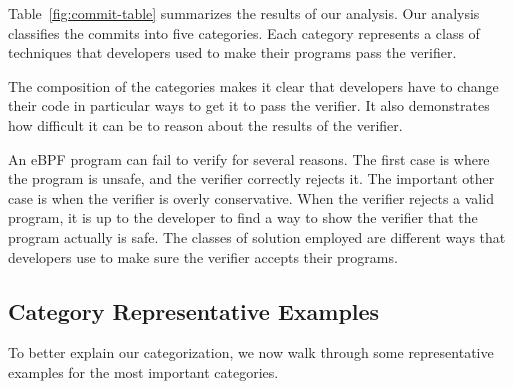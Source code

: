 Table~\ref{fig:commit-table} summarizes the results of our analysis.
Our analysis classifies the commits into five categories.
Each category represents a class of techniques that developers used to make their programs pass the verifier.


The composition of the categories makes it clear that developers have to change their code in particular ways to get it to pass the verifier.
It also demonstrates how difficult it can be to reason about the results of the verifier.

An eBPF program can fail to verify for several reasons.
The first case is where the program is unsafe, and the verifier correctly rejects it.
The important other case is when the verifier is overly conservative.
When the verifier rejects a valid program, it is up to the developer to find a way to show the verifier that the program actually is safe.
The classes of solution employed are different ways that developers use to make sure the verifier accepts their programs.

\subsection{Category Representative Examples}
To better explain our categorization, we now walk through some representative examples for the most important categories.

